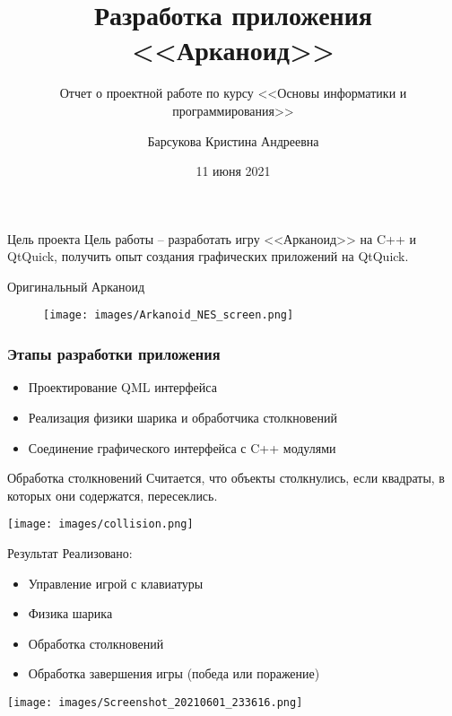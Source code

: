 \documentclass[10pt]{beamer}
\title{Разработка приложения <<Арканоид>>}
\subtitle{Отчет о проектной работе по курсу <<Основы информатики и программирования>>}
\author{Барсукова Кристина Андреевна}
\date{11 июня 2021}
\begin{document}
\maketitle

\begin{frame}[fragile]{Цель проекта}
    Цель работы -- разработать игру <<Арканоид>> на C++ и QtQuick, получить опыт создания графических приложений на QtQuick.
\end{frame}

\begin{frame}{Оригинальный Арканоид}
    \begin{figure}
        \centering
        \texttt{[image: images/Arkanoid\_NES\_screen.png]}
    \end{figure}
\end{frame}

\begin{frame}
    \frametitle{Этапы разработки приложения}
    \begin{itemize}
        \item Проектирование QML интерфейса
        \item Реализация физики шарика и обработчика столкновений
        \item Соединение графического интерфейса с C++ модулями
    \end{itemize}
\end{frame}

\begin{frame}{Обработка столкновений}
    Считается, что объекты столкнулись, если квадраты, в которых они содержатся, пересеклись.
    \begin{center}
        \texttt{[image: images/collision.png]}
    \end{center}
\end{frame}

\begin{frame}[fragile]{Результат}
    Реализовано:
    \begin{itemize}
        \item Управление игрой с клавиатуры
        \item Физика шарика
        \item Обработка столкновений
        \item Обработка завершения игры (победа или поражение)
    \end{itemize}

    \begin{center}
        \texttt{[image: images/Screenshot\_20210601\_233616.png]}
    \end{center}

\end{frame}
\end{document}
